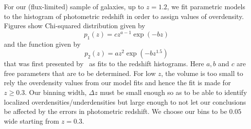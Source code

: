 \documentclass[twocolumn,useAMS,usenatbib]{mn2e}
\newcommand{\rachel}[1]{{\textcolor{red}{#1}}}
\begin{document}

For our (flux-limited) sample of galaxies, up to $z=1.2$, we fit parametric models to the histogram of photometric redshift in order to assign values of overdensity. Figures show Chi-squared distribution given by
\begin{equation}
 p_1(z) = cz^{a-1}\exp({-bz})
\end{equation}
and the function given by
\begin{equation}
 p_2(z) = az^2\exp{(-bz^{1.5})}
\end{equation}
that was first presented by~\cite{Redshift_modelling} as fits to the redshift histograms. Here $a,b$ and $c$ are free parameters that are to be determined.
For low $z$, the volume is too small to rely the overdensity values from our model fits and hence the fit is made for $z \ge 0.3$. Our binning width, $\Delta z$ must be small enough so as to be able to identify localized overdensities/underdensities but large enough to not let our conclusions be affected by the errors in photometric redshift. 
We choose our bins to be $0.05$ wide starting from $z=0.3$. 

\end{document}
